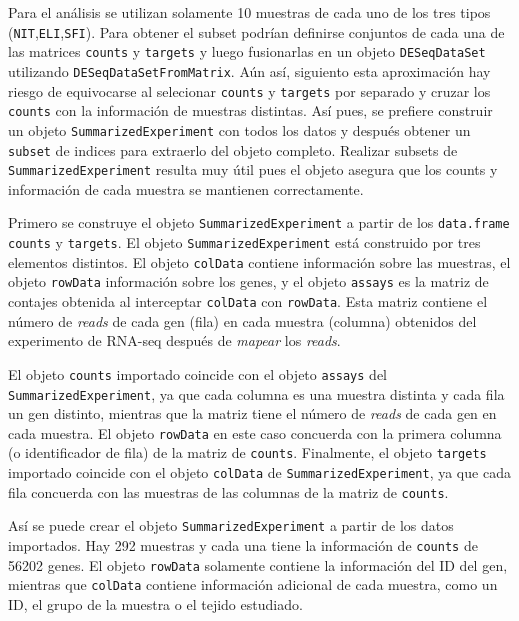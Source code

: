 \documentclass[
]{article}
\begin{document}
Para el análisis se utilizan solamente 10 muestras de cada uno de los
tres tipos (\texttt{NIT},\texttt{ELI},\texttt{SFI}). Para obtener el
subset podrían definirse conjuntos de cada una de las matrices
\texttt{counts} y \texttt{targets} y luego fusionarlas en un objeto
\texttt{DESeqDataSet} utilizando \texttt{DESeqDataSetFromMatrix}. Aún
así, siguiento esta aproximación hay riesgo de equivocarse al selecionar
\texttt{counts} y \texttt{targets} por separado y cruzar los
\texttt{counts} con la información de muestras distintas. Así pues, se
prefiere construir un objeto \texttt{SummarizedExperiment} con todos los
datos y después obtener un \texttt{subset} de indices para extraerlo del
objeto completo. Realizar subsets de \texttt{SummarizedExperiment}
resulta muy útil pues el objeto asegura que los counts y información de
cada muestra se mantienen correctamente.

Primero se construye el objeto \texttt{SummarizedExperiment} a partir de
los \texttt{data.frame} \texttt{counts} y \texttt{targets}. El objeto
\texttt{SummarizedExperiment} está construido por tres elementos
distintos. El objeto \texttt{colData} contiene información sobre las
muestras, el objeto \texttt{rowData} información sobre los genes, y el
objeto \texttt{assays} es la matriz de contajes obtenida al interceptar
\texttt{colData} con \texttt{rowData}. Esta matriz contiene el número de
\emph{reads} de cada gen (fila) en cada muestra (columna) obtenidos del
experimento de RNA-seq después de \emph{mapear} los \emph{reads}.

El objeto \texttt{counts} importado coincide con el objeto
\texttt{assays} del \texttt{SummarizedExperiment}, ya que cada columna
es una muestra distinta y cada fila un gen distinto, mientras que la
matriz tiene el número de \emph{reads} de cada gen en cada muestra. El
objeto \texttt{rowData} en este caso concuerda con la primera columna (o
identificador de fila) de la matriz de \texttt{counts}. Finalmente, el
objeto \texttt{targets} importado coincide con el objeto
\texttt{colData} de \texttt{SummarizedExperiment}, ya que cada fila
concuerda con las muestras de las columnas de la matriz de
\texttt{counts}.

Así se puede crear el objeto \texttt{SummarizedExperiment} a partir de
los datos importados. Hay 292 muestras y cada una tiene la información
de \texttt{counts} de 56202 genes. El objeto \texttt{rowData} solamente
contiene la información del ID del gen, mientras que \texttt{colData}
contiene información adicional de cada muestra, como un ID, el grupo de
la muestra o el tejido estudiado.
\end{document}
